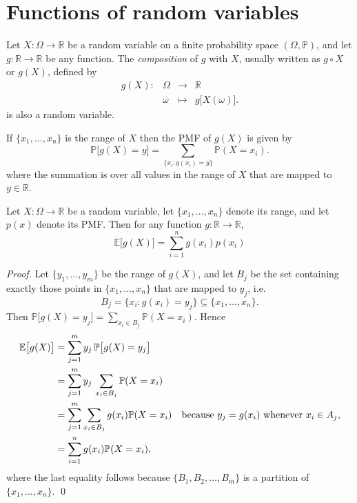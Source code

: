\documentclass[lecture]{csm}
\newcommand{\R}{\mathbb{R}}
\newcommand{\prob}{\mathbb{P}}
\newcommand{\expe}{\mathbb{E}}
\def\it{\item}
\def\bit{\begin{itemize}}
\def\eit{\end{itemize}}
\begin{document}
\maketitle
\tableofcontents

\section{Functions of random variables}
Let $X:\Omega\to\R$ be a random variable on a finite probability space $(\Omega,\prob)$, and let $g:\R\to\R$ be any function. The \emph{composition} of $g$ with $X$, usually written as $g\circ X$ or $g(X)$, defined by
\[\begin{array}{rlcl}
g(X): 	& \Omega & \to		& \R \\
			& \omega & \mapsto	& g\big[X(\omega)\big].
\end{array}\]
is also a random variable.
\par
If $\{x_1,\ldots,x_n\}$ is the range of $X$ then the PMF of $g(X)$ is given by
\[
\prob\big[g(X)=y\big] = \sum_{\{x_i:g(x_i)=y\}}\prob(X=x_i).
\]
where the summation is over all values in the range of $X$ that are mapped to $y\in\R$.

\begin{theorem}\label{thm:lus}
Let $X:\Omega\to\R$ be a random variable, let $\{x_1,\ldots,x_n\}$ denote its range, and let $p(x)$ denote its PMF. Then for any function $g:\R\to\R$,
\[
\expe\big[g(X)\big] = \sum_{i=1}^n g(x_i)p(x_i)
\]
\end{theorem}

\begin{proof}
Let $\{y_1,\ldots,y_m\}$ be the range of $g(X)$, and let $B_j$ be the set containing exactly those points in $\{x_1,\ldots,x_n\}$ that are mapped to $y_j$, i.e.
$$
B_j  = \{x_i:g(x_i)=y_j\} \subseteq \{x_1,\ldots,x_n\}.
$$
Then $\prob\big[g(X)=y_j\big] = \sum_{x_i\in B_j}\prob(X=x_i)$. Hence
\begin{align*}
\expe\big[g(X)\big]
	& = \sum_{j=1}^m y_j\,\prob\big[g(X)=y_j\big] \\
	& = \sum_{j=1}^m y_j\,\sum_{x_i\in B_j} \prob(X=x_i) \\
	& = \sum_{j=1}^m \sum_{x_i\in B_j} g(x_i)\prob(X=x_i) \text{\quad because $y_j=g(x_i)$ whenever $x_i\in A_j$,}\\
	& = \sum_{i=1}^n g(x_i)\prob(X=x_i),%
\end{align*}
where the last equality follows because $\{B_1,B_2,\ldots,B_m\}$ is a partition of $\{x_1,\ldots,x_n\}$.
\qed
\end{proof}
\end{document}
